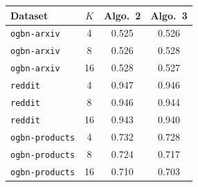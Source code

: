 \begin{tabular}{lccc}
\toprule
Dataset & $K$ & Algo.~2 & Algo.~3 \\
\midrule
\texttt{ogbn-arxiv} & 4 & 0.525 & 0.526 \\
\texttt{ogbn-arxiv} & 8 & 0.526 & 0.528 \\
\texttt{ogbn-arxiv} & 16 & 0.528 & 0.527 \\
\texttt{reddit} & 4 & 0.947 & 0.946 \\
\texttt{reddit} & 8 & 0.946 & 0.944 \\
\texttt{reddit} & 16 & 0.943 & 0.940 \\
\texttt{ogbn-products} & 4 & 0.732 & 0.728 \\
\texttt{ogbn-products} & 8 & 0.724 & 0.717 \\
\texttt{ogbn-products} & 16 & 0.710 & 0.703 \\
\bottomrule
\end{tabular}
